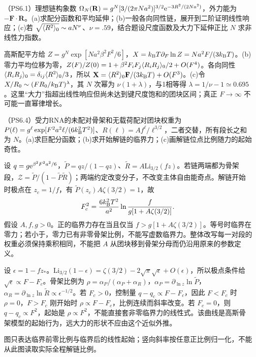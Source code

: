 \begin{exercise}
（PS6.1）理想链构象数 $\Omega_N(\mathbf R)=g^N[3/(2\pi Na^2)]^{3/2}\mathrm e^{-3R^2/(2Na^2)}$，外力能为 $-\mathbf F\cdot\mathbf R$。(a)求配分函数和平均延伸；(b)一般各向同性链，展开到二阶证明线性响应；(c)若 $\sqrt{\langle R^2\rangle_0}\sim aN^\nu$、$\nu=.59$，结合题设尺度函数及大力下延伸正比 $N$ 求非线性力指数。
\end{exercise}
\begin{solution}
高斯配平方给 $Z=g^N\exp[Na^2\beta^2F^2/6]$，$X=k_{\mathrm B} T\partial_F\ln Z=Na^2F/(3k_{\mathrm B} T)$。(b)零力平均位移为零，$Z(F)/Z(0)=1+\beta^2F_iF_j\langle R_iR_j\rangle_0/2+O(F^4)$。各向同性 $\langle R_iR_j\rangle_0=\delta_{ij}\langle R^2\rangle_0/3$，所以 $\mathbf X=\langle R^2\rangle_0\mathbf F/(3k_{\mathrm B} T)+O(F^3)$。(c)令 $X/R_0\sim(FR_0/k_{\mathrm B} T)^\lambda$，其 $N$ 次幂为 $\nu(1+\lambda)$，与1相等得 $\lambda=1/\nu-1\simeq0.695$。这里“大力”指超出线性响应但尚未达到键尺度饱和的团块区间；真正 $F\to\infty$ 不可能一直幂律增长。
\end{solution}

\begin{exercise}
（PS6.4）受力RNA的未配对骨架和无载荷配对团块权重为 $P(\ell)=g^\ell\exp[F^2a^2\ell/(6k_{\mathrm B}^2T^2)]$、$R(\ell)=A f^\ell/\ell^{3/2}$，二者交替，所有段长之和为 $N$。(a)求巨配分函数；(b)求开始解链的临界力；(c)画解链位点比例随力的起始奇性。
\end{exercise}
\begin{solution}
设 $q=g\mathrm e^{\beta^2F^2a^2/6}$，$\widetilde P=qz/(1-qz)$、$\widetilde R=A\mathrm{Li}_{3/2}(fz)$。若链两端都为骨架段，$\mathcal Z=\widetilde P/(1-\widetilde P\widetilde R)$；两端约定改变分子，不改变主体自由能奇点。解链开始时极点在 $z_c=1/f$，有 $\widetilde P(z_c)A\zeta(3/2)=1$，故
\[
F_c^2=\frac{6k_{\mathrm B}^2T^2}{a^2}\ln\frac{f}{g[1+A\zeta(3/2)]}.
\]
假设 $A,f,g>0$。正的临界力存在当且仅当 $f>g[1+A\zeta(3/2)]$。等号时临界在零力；若小于，零力已有非零骨架比例，不能写虚数临界力。整体改写每一对段的权重必须保持乘积相同，不能把 $A$ 从团块移到骨架分母而仍沿用原来的参数定义。

设 $\epsilon=1-fz_*$。$\mathrm{Li}_{3/2}(1-\epsilon)=\zeta(3/2)-2\sqrt\pi\sqrt\epsilon+O(\epsilon)$，所以极点条件给 $\sqrt\epsilon\propto F-F_c$。骨架比例为 $\rho=\alpha_P/(\alpha_P+\alpha_R)$，$\alpha_P=\partial_{\ln z}\ln\widetilde P$，$\alpha_R=\partial_{\ln z}\ln\widetilde R\propto\epsilon^{-1/2}$。若 $F_c>0$，控制量 $q-q_c\propto F-F_c$，因此 $F<F_c$ 时 $\rho=0$，$F>F_c$ 刚开始时 $\rho\propto F-F_c$，比例连续而斜率改变。若 $F_c=0$，则 $q-q_c\propto F^2$，起始是 $\rho\propto F^2$，不能直接套非零临界力的线性式。该曲线是高斯骨架模型的起始行为，远大力的形状不应由这个近似外推。
\begin{center}\end{center}
图只表达临界前零比例与临界后的线性起始；竖向斜率按任意正比例归一化，不能从此图读取实际全程解链比例。

\end{solution}
